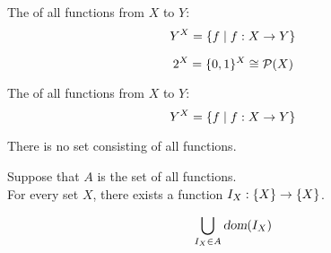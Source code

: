 \begin{frame}
  \begin{definition}
    The  of all functions from $X$ to $Y$:
    \[
      Y^{X} = \{f \mid f: X \to Y\}
    \]
  \end{definition}

  \[
    2^{X} = \{0, 1\}^{X} \cong \mathcal{P}(X)
  \]

\end{frame}

\begin{frame}
  \begin{definition}
    The  of all functions from $X$ to $Y$:
    \[
      Y^{X} = \{f \mid f: X \to Y\}
    \]
  \end{definition}

  \pause
  \begin{center}
  \end{center}

  \pause
  \begin{theorem}
    There is no set consisting of all functions.
  \end{theorem}

  \pause
  \begin{center}
    Suppose  that $A$ is the set of all functions. \\[8pt]

    \pause
    For every set $X$, there exists a function $I_{X}: \{X\} \to \{X\}$.

    \pause
    \[
      \bigcup_{I_{X} \in A} \textsl{dom}(I_{X})
    \]
  \end{center}
\end{frame}

